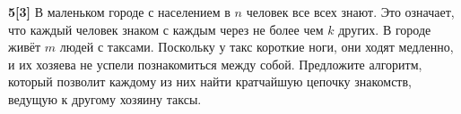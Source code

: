 \documentclass{article}
\begin{document}
\medskip

\textbf{5[3]} В маленьком городе с населением в $n$ человек все всех знают. Это означает, что каждый человек знаком с каждым через не более чем $k$ других. В городе живёт $m$ людей с таксами. Поскольку у такс короткие ноги, они ходят медленно, и их хозяева не успели познакомиться между собой. Предложите алгоритм, который позволит каждому из них найти кратчайшую цепочку знакомств, ведущую к другому хозяину таксы.








\end{document}
